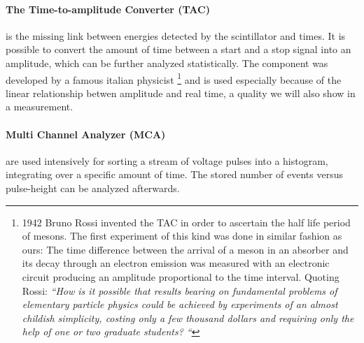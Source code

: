 \paragraph{The Time-to-amplitude Converter (TAC)} is the missing link between energies detected by the scintillator
and times. It is possible to convert the amount of time between a start and a stop signal into an amplitude,
which can be further analyzed statistically. The component was developed by a famous italian physicist%
\footnote{1942 Bruno Rossi invented the TAC in order to ascertain the half life period of mesons. The first
    experiment of this kind was done in similar fashion as ours: The time difference between the
    arrival of a meson in an absorber and its decay through an electron emission was measured with an
    electronic circuit producing an amplitude proportional to the time interval. Quoting Rossi:
    \textit{``How is it possible that results bearing on fundamental problems of
        elementary particle physics could be achieved by experiments of an almost childish simplicity,
        costing only a few thousand dollars and requiring only the help of one or two graduate students? ``}}
and is used especially because of the linear relationship betwen amplitude and real time, a quality we will also
show in a measurement.
\paragraph{Multi Channel Analyzer (MCA)} are used intensively for sorting a stream of voltage pulses
into a histogram, integrating over a specific amount of time. The stored number of events versus pulse-height
can be analyzed afterwards.
